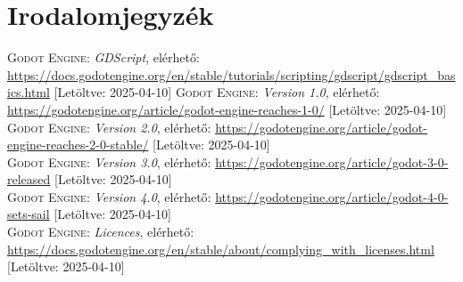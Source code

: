 \documentclass[
]{thesis-ekf}
\theoremstyle{definition}
\theoremstyle{remark}
\begin{document}
\chapter*{Irodalomjegyzék}
\begin{thebibliography}{2}
\textsc{Godot Engine}: \emph{GDScript}, elérhető:
\url{https://docs.godotengine.org/en/stable/tutorials/scripting/gdscript/gdscript_basics.html} [Letöltve: 2025-04-10]
\textsc{Godot Engine}: \emph{Version 1.0}, elérhető:
\url{https://godotengine.org/article/godot-engine-reaches-1-0/} [Letöltve: 2025-04-10]\\
\textsc{Godot Engine}: \emph{Version 2.0}, elérhető:
\url{https://godotengine.org/article/godot-engine-reaches-2-0-stable/} [Letöltve: 2025-04-10]\\
\textsc{Godot Engine}: \emph{Version 3.0}, elérhető:
\url{https://godotengine.org/article/godot-3-0-released} [Letöltve: 2025-04-10]\\
\textsc{Godot Engine}: \emph{Version 4.0}, elérhető:
\url{https://godotengine.org/article/godot-4-0-sets-sail} [Letöltve: 2025-04-10]\\
\textsc{Godot Engine}: \emph{Licences}, elérhető:
\url{https://docs.godotengine.org/en/stable/about/complying_with_licenses.html} [Letöltve: 2025-04-10]\\


\end{thebibliography}
\end{document}
